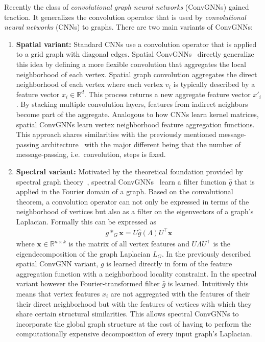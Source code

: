 \documentclass[12pt]{scrartcl}
\begin{document}
\begin{enumerate}[label=\textbf{\arabic*.}]
		Recently the class of \textit{convolutional graph neural networks} (ConvGNNs) gained traction.
		It generalizes the convolution operator that is used by \textit{convolutional neural networks} (CNNs) to graphs.
		There are two main variants of ConvGNNs:
		\begin{enumerate}[label=\textbf{\alph*)}] %
			\item \textbf{Spatial variant:}
				Standard CNNs use a convolution operator that is applied to a grid graph with diagonal edges.
				Spatial ConvGNNs~\cite{Micheli2009} directly generalize this idea by defining a more flexible convolution that aggregates the local neighborhood of each vertex.
				Spatial graph convolution aggregates the direct neighborhood of each vertex where each vertex $v_i$ is typically described by a feature vector $x_i \in \mathbb{R}^d$.
				This process returns a new aggregate feature vector $x'_i$.
				By stacking multiple convolution layers, features from indirect neighbors become part of the aggregate.
				Analogous to how CNNs learn kernel matrices, spatial ConvGNNs learn vertex neighborhood feature aggregation functions.
				This approach shares similarities with the previously mentioned message-passing architecture~\cite{Gori2005} with the major different being that the number of message-passing, i.e.\ convolution, steps is fixed.
			\item \textbf{Spectral variant:}
				Motivated by the theoretical foundation provided by spectral graph theory~\cite{Shuman2013}, spectral ConvGNNs~\cite{Bruna2013} learn a filter function $\hat{g}$ that is applied in the Fourier domain of a graph.
				Based on the convolutional theorem, a convolution operator can not only be expressed in terms of the neighborhood of vertices but also as a filter on the eigenvectors of a graph's Laplacian.
				Formally this can be expressed as
				\begin{align*}
					g *_G \bm{x} = U \hat{g}(\Lambda) U^{\top} \bm{x}
				\end{align*}
				where $\bm{x} \in \mathbb{R}^{n \times k}$ is the matrix of all vertex features and $U \Lambda U^{\top}$ is the eigendecomposition of the graph Laplacian $L_G$.
				In the previously described spatial ConvGNN variant, $g$ is learned directly in form of the feature aggregation function with a neighborhood locality constraint.
				In the spectral variant however the Fourier-transformed filter $\hat{g}$ is learned.
				Intuitively this means that vertex features $x_i$ are not aggregated with the features of their their direct neighborhood but with the features of vertices with which they share certain structural similarities.
				This allows spectral ConvGNNs to incorporate the global graph structure at the cost of having to perform the computationally expensive decomposition of every input graph's Laplacian.


\end{enumerate}
\end{enumerate}
\end{document}
